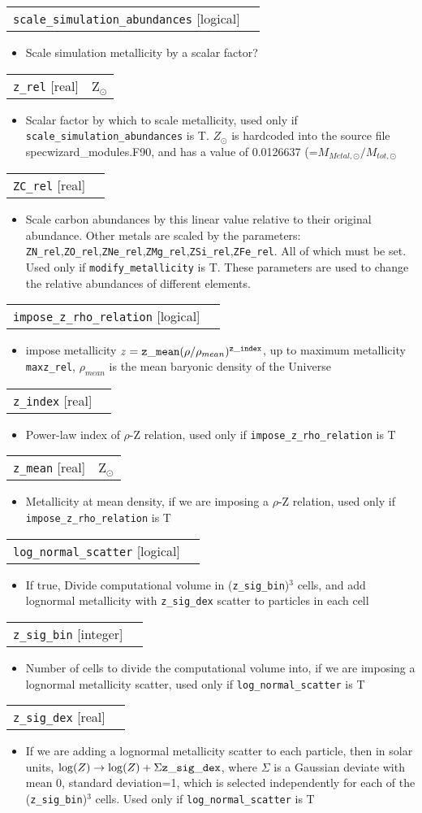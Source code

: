 \documentclass{report}
\makeatletter
\newcommand{\paramdefinition}[3]{
\begin{tabular*}{\textwidth}{l@{\extracolsep{\fill}}r}
		{\tt #1} [{\sc #2}]& #3 \\
\end{tabular*}}
\newcommand{\paramdescription}[1]{
\begin{itemize}
\item #1
\end{itemize}\vspace{0.2cm}}
\makeatother
\begin{document}
\paramdefinition{scale\_simulation\_abundances}{logical}{ }
\paramdescription{Scale simulation metallicity by a scalar factor?}

\paramdefinition{z\_rel}{real}{Z$_{\odot}$}
\paramdescription{Scalar factor by which to scale metallicity, used only if {\tt scale\_simulation\_abundances} is T.   $Z_{\odot}$ is hardcoded into the source file specwizard\_modules.F90, and has a value of 0.0126637  (=$M_{Metal,\odot}/M_{tot,\odot}$}

\paramdefinition{ZC\_rel}{real}{}
\paramdescription{Scale carbon abundances by this linear value relative to their original abundance.  Other metals are scaled by the parameters: {\tt ZN\_rel},{\tt ZO\_rel},{\tt ZNe\_rel},{\tt ZMg\_rel},{\tt ZSi\_rel},{\tt ZFe\_rel}.  All of which must be set.  Used only if {\tt modify\_metallicity} is T.  These parameters are used to change the relative abundances of different elements.}

\paramdefinition{impose\_z\_rho\_relation}{logical}{ }
\paramdescription{ impose metallicity $z = {\tt z\_mean} (\rho/\rho_{mean})^{{\tt z\_index}}$, up to maximum metallicity {\tt maxz\_rel}, $\rho_{mean}$ is the mean baryonic density of the Universe}

\paramdefinition{z\_index}{real}{ }
\paramdescription{Power-law index of $\rho$-Z relation, used only if {\tt impose\_z\_rho\_relation} is T}

\paramdefinition{z\_mean}{real}{Z$_{\odot}$}
\paramdescription{Metallicity at mean density, if we are imposing a $\rho$-Z relation, used only if {\tt impose\_z\_rho\_relation} is T}

\paramdefinition{log\_normal\_scatter}{logical}{ }
\paramdescription{If true, Divide computational volume in ({\tt z\_sig\_bin})$^3$ cells, and add lognormal metallicity with {\tt z\_sig\_dex} scatter to particles in each cell}

\paramdefinition{z\_sig\_bin}{integer}{}
\paramdescription{Number of cells to divide the computational volume into, if we are imposing a lognormal metallicity scatter, used only if {\tt log\_normal\_scatter} is T}

\paramdefinition{z\_sig\_dex}{real}{}
\paramdescription{If we are adding a lognormal metallicity scatter to each particle, then in solar units, $\log(Z) \rightarrow \log(Z)+\Sigma {\tt z\_sig\_dex}$, where $\Sigma$ is a Gaussian deviate with mean 0, standard deviation=1, which is selected independently for each of the ({\tt z\_sig\_bin})$^3$ cells. Used only if {\tt log\_normal\_scatter} is T}
\end{document}
